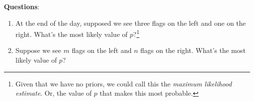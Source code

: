 \documentclass[11pt, oneside]{article} 	%
\begin{document}
\textbf{Questions}:
\begin{enumerate}
\item At the end of the day, supposed we see three flags on the left and one on the right.  What's the most likely value of $p$?\footnote{Given that we have no priors, we could call this the \emph{maximum likelihood estimate}. Or, the value of $p$ that makes this most probable.}
\item Suppose we see $m$ flags on the left and $n$ flags on the right.  What's the most likely value of $p$?
\end{enumerate}

\end{document}

